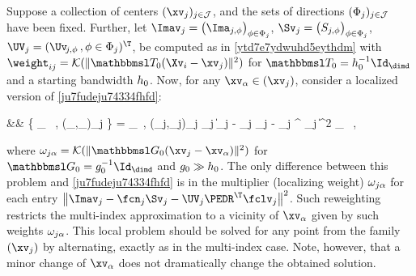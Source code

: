 Suppose a collection of centers \( ( \xv_{j} )_{j \in \JJJ} \), and 
the sets of directions \( (\Phi_{j})_{j \in \mathcal{J}} \) have been fixed.
% 
Further, let 
\( \Imav_{j} = \bigl( \Ima_{j,\sph} \bigr)_{\sph \in \Sph_{j}} \),
\( \Sv_{j} = \bigl( S_{j,\sph} \bigr)_{\sph \in \Sph_{j}} \),
\( \UV_{j} = (\Uv_{\jm,\sph} \, , \sph \in \Sph_{j})^{\T} \),
be computed as in \eqref{ytd7e7ydwuhd5eythdm} with 
\( \weight_{ij} = \Kern(\| \TEDR_{0} (\Xv_{i} - \xv_{j}) \|^{2}) \)
for \( \TEDR_{0} = \hiso_{0}^{-1} \Id_{\dimd} \) and a starting bandwidth \( h_{0} \).
%
Now, for any \( \xv_{\jl} \in (\xv_{j}) \), consider a localized version of
\eqref{ju7fudeju74334fhfd}:
\begin{EQA}[rcl]
	&& \nquad
	\bigl\{ \PEDR_{\jl} \, , (\fcn_{\jjl},\fclv_{\jjl})_{j \in \JJJ} \bigr\}
	= 
	\arginf_{\PEDR \, , (\fcn_{j},\fclv_{j})_{j \in \JJJ}} 
	\sum_{j \in \JJJ} 
	\bigl\| \Imav_{j} - \fcn_{j} \Sv_{j} - \UV_{j} \PEDR^{\T} \fclv_{j} \bigr\|^{2}
	\weightM_{\jjl}
	\, ,
	\qquad \quad
\label{kjhviir8786tytcdeefm}
\end{EQA}
where \( \weightM_{\jjl} = \Kern(\| \TEDRm_{0} (\xv_{j} - \xv_{\jl}) \|^{2}) \) for
\( \TEDRm_{0} = \hisom_{0}^{-1} \Id_{\dimd} \) and \( g_{0} \gg h_{0} \).
The only difference between this problem and \eqref{ju7fudeju74334fhfd} is in the multiplier (localizing weight)
\( \omega_{j\alpha} \)
for each entry \( \bigl\| \Imav_{j} - \fcn_{j} \Sv_{j} - \UV_{j} \PEDR^{\T} \fclv_{j} \bigr\|^{2} \).
Such reweighting restricts the multi-index approximation to a vicinity of \( \xv_{\jl} \) given by 
such weights \( \omega_{j\alpha} \). 
This local problem should be solved for any point from the family \( (\xv_{j}) \)
by alternating, exactly as in the multi-index case.
Note, however, that a minor change of \( \xv_{\jl} \) does not dramatically change the obtained solution.
